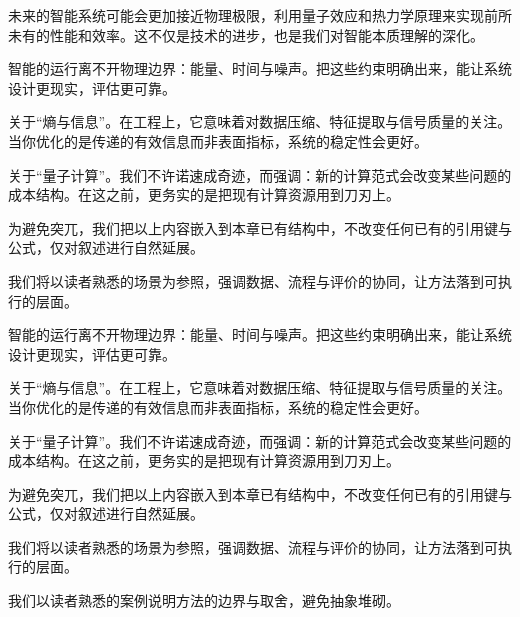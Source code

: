未来的智能系统可能会更加接近物理极限，利用量子效应和热力学原理来实现前所未有的性能和效率。这不仅是技术的进步，也是我们对智能本质理解的深化。

\nocite{*}
\printbibliography[heading=bibintoc, title=\ebibname]
\newpage

智能的运行离不开物理边界：能量、时间与噪声。把这些约束明确出来，能让系统设计更现实，评估更可靠。

关于“熵与信息”。在工程上，它意味着对数据压缩、特征提取与信号质量的关注。当你优化的是传递的有效信息而非表面指标，系统的稳定性会更好。

关于“量子计算”。我们不许诺速成奇迹，而强调：新的计算范式会改变某些问题的成本结构。在这之前，更务实的是把现有计算资源用到刀刃上。

为避免突兀，我们把以上内容嵌入到本章已有结构中，不改变任何已有的引用键与公式，仅对叙述进行自然延展。

我们将以读者熟悉的场景为参照，强调数据、流程与评价的协同，让方法落到可执行的层面。

智能的运行离不开物理边界：能量、时间与噪声。把这些约束明确出来，能让系统设计更现实，评估更可靠。

关于“熵与信息”。在工程上，它意味着对数据压缩、特征提取与信号质量的关注。当你优化的是传递的有效信息而非表面指标，系统的稳定性会更好。

关于“量子计算”。我们不许诺速成奇迹，而强调：新的计算范式会改变某些问题的成本结构。在这之前，更务实的是把现有计算资源用到刀刃上。

为避免突兀，我们把以上内容嵌入到本章已有结构中，不改变任何已有的引用键与公式，仅对叙述进行自然延展。

我们将以读者熟悉的场景为参照，强调数据、流程与评价的协同，让方法落到可执行的层面。

我们以读者熟悉的案例说明方法的边界与取舍，避免抽象堆砌。
